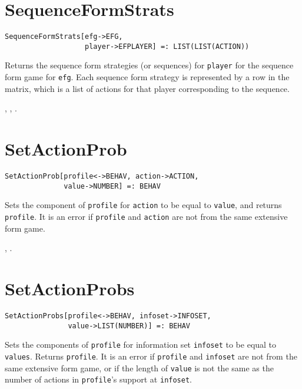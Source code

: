 
\section*{SequenceFormStrats}\label{PrimSequenceFormStrats}
\begin{verbatim} 
SequenceFormStrats[efg->EFG, 
                   player->EFPLAYER] =: LIST(LIST(ACTION))
\end{verbatim}

\noindent
Returns the sequence form strategies (or sequences) for
\verb+player+ for the sequence form game for \verb+efg+. Each
sequence form strategy is represented by a row in the matrix, which is
a list of actions for that player corresponding to the sequence.  

\seealso {},
,
.


\section*{SetActionProb}\label{PrimSetActionProb}
\begin{verbatim} 
SetActionProb[profile<->BEHAV, action->ACTION, 
              value->NUMBER] =: BEHAV 
\end{verbatim}

\noindent
Sets the component of \verb+profile+ for
\verb+action+ to be equal to \verb+value+, and 
returns \verb+profile+.  It is an error if \verb+profile+ and \verb+action+
are not from the same extensive form game. 

\seealso {},
.


\section*{SetActionProbs}\label{PrimSetActionProbs}
\begin{verbatim} 
SetActionProbs[profile<->BEHAV, infoset->INFOSET, 
               value->LIST(NUMBER)] =: BEHAV 
\end{verbatim}

\noindent
Sets the components of \verb+profile+ for
information set \verb+infoset+ to be equal to \verb+values+.
Returns \verb+profile+.  It is an error if \verb+profile+ and \verb+infoset+
are not from the same extensive form game, or if the length of
\verb+value+ is not the same as the number of actions in \verb+profile+'s
support at \verb+infoset+.

